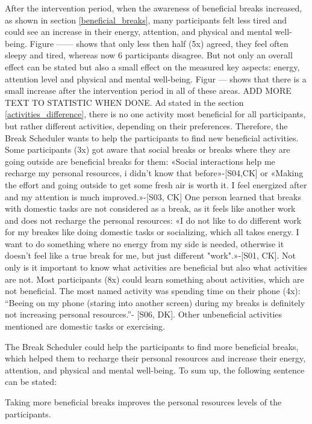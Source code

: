 \documentclass{hasel_thesis}
\begin{document}
After the intervention period, when the awareness of beneficial breaks increased, as shown in section \ref{beneficial_breaks}, many participants felt less tired and could see an increase in their energy, attention, and physical and mental well-being. Figure ------ shows that only less then half (5x) agreed, they feel often sleepy and tired, whereas now 6 participants disagree. But not only an overall effect can be stated but also a small effect on the measured key aspects: energy, attention level and physical and mental well-being. Figur --- shows that there is a small increase after the intervention period in all of these areas. ADD MORE TEXT TO STATISTIC WHEN DONE. Ad stated in the section \ref{activities_difference}, there is no one activity most beneficial for all participants, but rather different activities, depending on their preferences. Therefore, the Break Scheduler wants to help the participants to find new beneficial activities. Some participants (3x) got aware that social breaks or breaks where they are going outside are beneficial breaks for them: «Social interactions help me recharge my personal resources, i didn't know that before»-[S04,CK] or «Making the effort and going outside to get some fresh air is worth it. I feel energized after and my attention is much improved.»-[S03, CK] One person learned that breaks with domestic tasks are not considered as a break, as it feels like another work and does not recharge the personal resources: «I do not like to do different work for my breakes like doing domestic tasks or socializing, which all takes energy. I want to do something where no energy from my side is needed, otherwise it doesn't feel like a true break for me, but just different "work".»-[S01, CK]. Not only is it important to know what activities are beneficial but also what activities are not. Most participants (8x) could learn something about activities, which are not beneficial. The most named activity was spending time on their phone (4x): “Beeing on my phone (staring into another screen) during my breaks is definitely not increasing personal resources.”- [S06, DK]. Other unbeneficial activities mentioned are domestic tasks or exercising. 

The Break Scheduler could help the participants to find more beneficial breaks, which helped them to recharge their personal resources and increase their energy, attention, and physical and mental well-being. To sum up, the following sentence can be stated:

\begin{tcolorbox}[colback=white!5!white,colframe=black!75!black]
 Taking more beneficial breaks improves the personal resources levels of the participants.
\end{tcolorbox}
\end{document}
